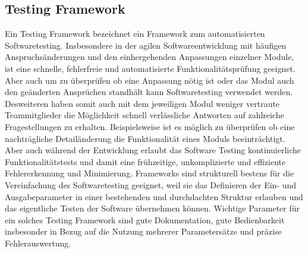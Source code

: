 \subsection{Testing Framework}
Ein Testing Framework bezeichnet ein Framework zum automatisierten Softwaretesting. Insbesondere in der agilen Softwareentwicklung mit häufigen Anspruchsänderungen und den einhergehenden Anpassungen einzelner Module, ist eine schnelle, fehlerfreie und automatisierte Funktionalitätsprüfung geeignet. Aber auch um zu überprüfen ob eine Anpassung nötig ist oder das Modul auch den geänderten Ansprüchen standhält kann Softwaretesting verwendet werden. Desweiteren haben somit auch mit dem jeweiligen Modul weniger vertraute Teammitglieder die Möglichkeit schnell verlässliche Antworten auf zahlreiche Fragestellungen zu erhalten. Beispielsweise ist es möglich zu überprüfen ob eine nachträgliche Detailänderung die Funktionalität eines Moduls beeinträchtigt. Aber auch während der Entwicklung erlaubt das Software Testing kontinuierliche Funktionalitätstests und damit eine frühzeitige, unkomplizierte und effiziente Fehlererkennung und Minimierung. Frameworks sind strukturell bestens für die Vereinfachung des Softwaretesting geeignet, weil sie das Definieren der Ein- und Ausgabeparameter in einer bestehenden und durchdachten Struktur erlauben und das eigentliche Testen der Software übernehmen können. Wichtige Parameter für ein solches Testing Framework sind gute Dokumentation, gute Bedienbarkeit insbesonder in Bezug auf die Nutzung mehrerer Parametersätze und präzise Fehlerauswertung. \cite{modultestwiki} \cite{frameworkwiki}